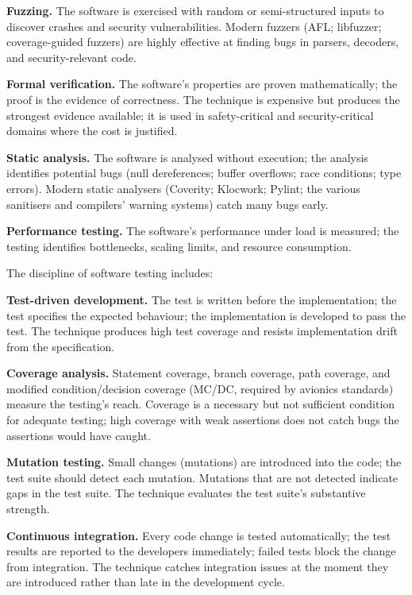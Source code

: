 \textbf{Fuzzing.} The software is exercised with random or semi-structured inputs to discover crashes and security vulnerabilities. Modern fuzzers (AFL; libfuzzer; coverage-guided fuzzers) are highly effective at finding bugs in parsers, decoders, and security-relevant code.

\textbf{Formal verification.} The software's properties are proven mathematically; the proof is the evidence of correctness. The technique is expensive but produces the strongest evidence available; it is used in safety-critical and security-critical domains where the cost is justified.

\textbf{Static analysis.} The software is analysed without execution; the analysis identifies potential bugs (null dereferences; buffer overflows; race conditions; type errors). Modern static analysers (Coverity; Klocwork; Pylint; the various sanitisers and compilers' warning systems) catch many bugs early.

\textbf{Performance testing.} The software's performance under load is measured; the testing identifies bottlenecks, scaling limits, and resource consumption.

The discipline of software testing includes:

\textbf{Test-driven development.} The test is written before the implementation; the test specifies the expected behaviour; the implementation is developed to pass the test. The technique produces high test coverage and resists implementation drift from the specification.

\textbf{Coverage analysis.} Statement coverage, branch coverage, path coverage, and modified condition/decision coverage (MC/DC, required by avionics standards) measure the testing's reach. Coverage is a necessary but not sufficient condition for adequate testing; high coverage with weak assertions does not catch bugs the assertions would have caught.

\textbf{Mutation testing.} Small changes (mutations) are introduced into the code; the test suite should detect each mutation. Mutations that are not detected indicate gaps in the test suite. The technique evaluates the test suite's substantive strength.

\textbf{Continuous integration.} Every code change is tested automatically; the test results are reported to the developers immediately; failed tests block the change from integration. The technique catches integration issues at the moment they are introduced rather than late in the development cycle.

